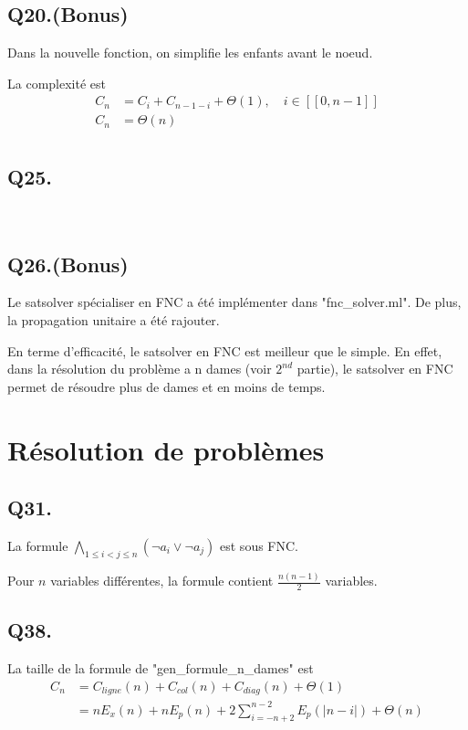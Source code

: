     \subsection*{Q20.(Bonus)}
    Dans la nouvelle fonction, on simplifie les enfants avant le noeud.
    
    La complexité est
    \begin{align*}
        C_n &= C_{i} + C_{n-1-i} + \Theta(1), \quad i \in [\![0,n-1]\!]\\
        C_n &= \boxed{\Theta(n)}\\
    \end{align*}
    
    \subsection*{Q25.}~
    
    \subsection*{Q26.(Bonus)}
    Le satsolver spécialiser en FNC a été implémenter dans "fnc\_solver.ml".
    De plus, la propagation unitaire a été rajouter.
    
    En terme d'efficacité, le satsolver en FNC est meilleur que le simple.
    En effet, dans la résolution du problème a n dames (voir $2^{nd}$ partie),
    le satsolver en FNC permet de résoudre plus de dames et en moins de temps.
    
    \section{Résolution de problèmes}
    \subsection*{Q31.}
    La formule
    $\boxed{\bigwedge\limits_{1 \leq i < j \leq n}\left(\lnot a_i \lor \lnot a_j\right)}$
    est sous FNC.
    
    Pour $n$ variables différentes, la formule contient $\frac{n(n-1)}{2}$ variables.
    
    \subsection*{Q38.}
    La taille de la formule de "gen\_formule\_n\_dames" est
    \begin{align*}
        C_n &= C_{ligne}(n) + C_{col}(n) + C_{diag}(n) + \Theta(1)\\
        &= nE_x(n) + nE_p(n) + 2\sum_{i=-n+2}^{n-2}E_p(|n-i|) + \Theta(n)\\
    \end{align*}
    
